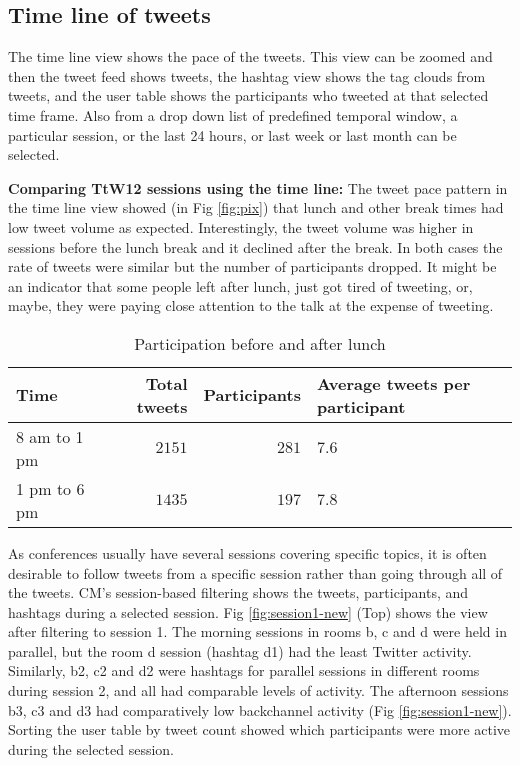 \documentclass[conference,final]{IEEEtran}
\begin{document}
\subsection{Time line of tweets}
The time line view shows the pace of the tweets. This view can be zoomed and then the tweet feed shows tweets, the hashtag view shows the tag clouds from tweets, and the user table shows the participants who tweeted at that selected time frame. Also from a drop down list of predefined temporal window, a particular session, or the last 24 hours, or last week or last month can be selected. 

\textbf{Comparing TtW12 sessions using the time line:}
The tweet pace pattern in the time line view showed (in Fig \ref{fig:pix}) that lunch and other break times had low tweet volume as expected. Interestingly, the tweet volume was higher in sessions before the lunch break and it declined after the break. In both cases the rate of tweets were similar but the number of participants dropped. It might be an indicator that some people left after lunch, just got tired of tweeting, or, maybe, they were paying close attention to the talk at the expense of tweeting. 

\begin{table}[tbp]
  
  \addtolength{\belowcaptionskip}{-50pt}	
	\setlength\abovecaptionskip{0pt}%
  \setlength\belowcaptionskip{10pt}%
\caption{Participation before and after lunch }
	\label{tab:tweetbytime}
		\centering
		\begin{tabular}{|p{1.5cm}|r|r|>{\raggedleft\arraybackslash}p{2cm}|}
\hline\hline %
         Time & Total tweets  & Participants & Average tweets per participant\\%
\hline %
8 am to 1 pm & $2151$ & $281 $ & $7.6$ \\
\hline
1 pm to 6 pm & $1435$ & $197$ & $7.8$\\
\hline
	\end{tabular}   
	\end{table}

As conferences usually have several sessions covering specific topics, it is often desirable to follow tweets from a specific session rather than going through all of the tweets. CM's session-based filtering shows the tweets, participants, and hashtags during a selected session. Fig \ref{fig:session1-new} (Top) shows the view after filtering to session 1. The morning sessions in rooms b, c and d were held in parallel, but the room d session (hashtag d1) had the least Twitter activity. Similarly, b2, c2 and d2 were hashtags for parallel sessions in different rooms during session 2, and all had comparable levels of activity. The afternoon sessions b3, c3 and d3 had comparatively low backchannel activity (Fig \ref{fig:session1-new}). Sorting the user table by tweet count showed which participants were more active during the selected session.
\end{document}
